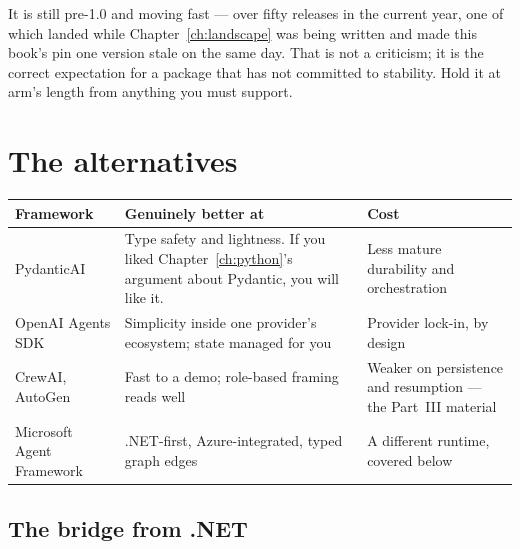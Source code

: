 \begin{versionbox}
It is still pre-1.0 and moving fast --- over fifty releases in the current year,
one of which landed while Chapter~\ref{ch:landscape} was being written and made
this book's pin one version stale on the same day. That is not a criticism; it is
the correct expectation for a package that has not committed to stability. Hold
it at arm's length from anything you must support.
\end{versionbox}

\section{The alternatives}
\label{sec:alternatives}

\begin{center}
\small
\begin{tabularx}{\linewidth}{@{}lXX@{}}
\toprule
\textbf{Framework} & \textbf{Genuinely better at} & \textbf{Cost} \\
\midrule
PydanticAI & Type safety and lightness. If you liked
  Chapter~\ref{ch:python}'s argument about Pydantic, you will like it. & Less
  mature durability and orchestration \\[3pt]
OpenAI Agents SDK & Simplicity inside one provider's ecosystem; state managed
  for you & Provider lock-in, by design \\[3pt]
CrewAI, AutoGen & Fast to a demo; role-based framing reads well & Weaker on
  persistence and resumption --- the Part~III material \\[3pt]
Microsoft Agent Framework & .NET-first, Azure-integrated, typed graph edges &
  A different runtime, covered below \\
\bottomrule
\end{tabularx}
\end{center}

\subsection{The bridge from .NET}
\label{sec:maf-bridge}


